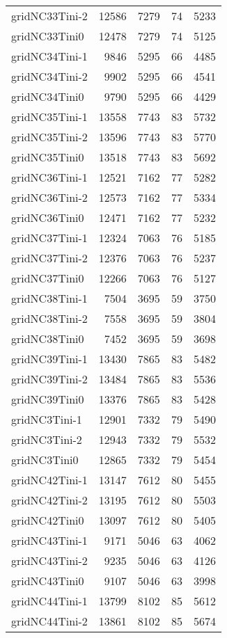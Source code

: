 \begin{longtable}{lrrrr}
gridNC33Tini-2 & 12586 & 7279 & 74 & 5233 \\
gridNC33Tini0 & 12478 & 7279 & 74 & 5125 \\
gridNC34Tini-1 & 9846 & 5295 & 66 & 4485 \\
gridNC34Tini-2 & 9902 & 5295 & 66 & 4541 \\
gridNC34Tini0 & 9790 & 5295 & 66 & 4429 \\
gridNC35Tini-1 & 13558 & 7743 & 83 & 5732 \\
gridNC35Tini-2 & 13596 & 7743 & 83 & 5770 \\
gridNC35Tini0 & 13518 & 7743 & 83 & 5692 \\
gridNC36Tini-1 & 12521 & 7162 & 77 & 5282 \\
gridNC36Tini-2 & 12573 & 7162 & 77 & 5334 \\
gridNC36Tini0 & 12471 & 7162 & 77 & 5232 \\
gridNC37Tini-1 & 12324 & 7063 & 76 & 5185 \\
gridNC37Tini-2 & 12376 & 7063 & 76 & 5237 \\
gridNC37Tini0 & 12266 & 7063 & 76 & 5127 \\
gridNC38Tini-1 & 7504 & 3695 & 59 & 3750 \\
gridNC38Tini-2 & 7558 & 3695 & 59 & 3804 \\
gridNC38Tini0 & 7452 & 3695 & 59 & 3698 \\
gridNC39Tini-1 & 13430 & 7865 & 83 & 5482 \\
gridNC39Tini-2 & 13484 & 7865 & 83 & 5536 \\
gridNC39Tini0 & 13376 & 7865 & 83 & 5428 \\
gridNC3Tini-1 & 12901 & 7332 & 79 & 5490 \\
gridNC3Tini-2 & 12943 & 7332 & 79 & 5532 \\
gridNC3Tini0 & 12865 & 7332 & 79 & 5454 \\
gridNC42Tini-1 & 13147 & 7612 & 80 & 5455 \\
gridNC42Tini-2 & 13195 & 7612 & 80 & 5503 \\
gridNC42Tini0 & 13097 & 7612 & 80 & 5405 \\
gridNC43Tini-1 & 9171 & 5046 & 63 & 4062 \\
gridNC43Tini-2 & 9235 & 5046 & 63 & 4126 \\
gridNC43Tini0 & 9107 & 5046 & 63 & 3998 \\
gridNC44Tini-1 & 13799 & 8102 & 85 & 5612 \\
gridNC44Tini-2 & 13861 & 8102 & 85 & 5674 \\

\end{longtable}
